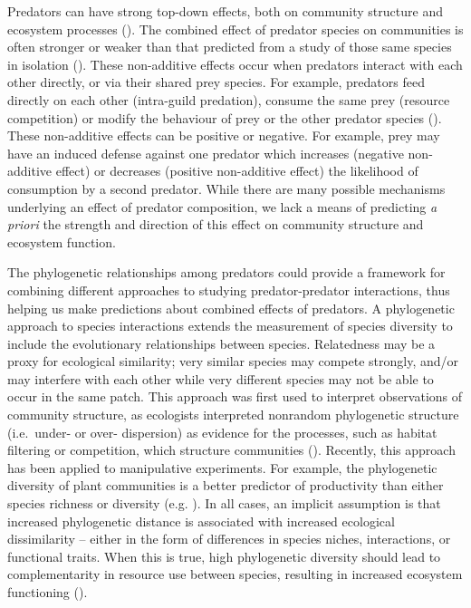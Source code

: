\documentclass[11pt]{article}
\begin{document}


Predators can have strong top-down effects, both on community structure
and ecosystem processes (\citealt{Estes2011}). The combined effect of
predator species on communities is often stronger or weaker than that
predicted from a study of those same species in isolation
(\citealt{Sih1998a, Ives2005}). These non-additive effects occur when
predators interact with each other directly, or via their shared prey
species. For example, predators feed directly on each other (intra-guild
predation), consume the same prey (resource competition) or modify the
behaviour of prey or the other predator species
(\citealt{Sih1998a, Griswold2006, Nystrom2001}). These non-additive effects
can be positive or negative. For example, prey may have an induced
defense against one predator which increases (negative non-additive
effect) or decreases (positive non-additive effect) the likelihood of
consumption by a second predator. While there are many possible
mechanisms underlying an effect of predator composition, we lack a
means of predicting \emph{a priori} the strength and direction of this
effect on community structure and ecosystem function.

The phylogenetic relationships among predators could provide a framework for combining different approaches to studying predator-predator interactions, thus helping us make
predictions about combined effects of predators. A phylogenetic approach to species interactions
extends the measurement of species diversity to include the evolutionary
relationships between species. Relatedness may be a proxy for ecological similarity; very
similar species may compete strongly, and/or may interfere with each
other while very different species may not be able to occur in the same
patch. This approach was first used to interpret observations of
community structure, as ecologists interpreted nonrandom phylogenetic
structure (i.e.~under- or over- dispersion) as evidence for the
processes, such as habitat filtering or competition, which structure
communities (\citealt{Webb2002, Cavender-Bares2009}). Recently, this
approach has been applied to manipulative experiments. For example, the
phylogenetic diversity of plant communities is a better predictor of
productivity than either species richness or diversity
(e.g. \citealt{Cadotte2009, Cadotte2008, Godoy2014}). In all cases, an
implicit assumption is that increased phylogenetic distance is
associated with increased ecological dissimilarity -- either in the form
of differences in species niches, interactions, or functional traits.
When this is true, high phylogenetic diversity should lead to
complementarity in resource use between species, resulting in increased
ecosystem functioning (\citealt{Srivastava2012c}). 
\end{document}
